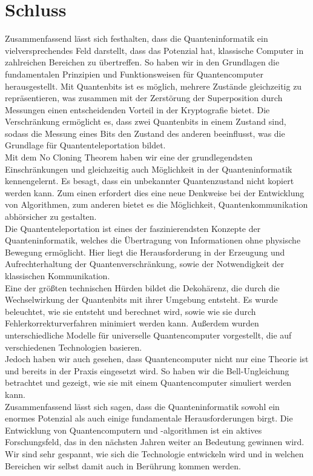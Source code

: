 \section{Schluss}
\label{sec:schluss}

Zusammenfassend lässt sich festhalten, dass die Quanteninformatik ein vielversprechendes Feld darstellt, dass das Potenzial hat, klassische Computer in zahlreichen Bereichen zu übertreffen.
So haben wir in den Grundlagen die fundamentalen Prinzipien und Funktionsweisen für Quantencomputer herausgestellt.
Mit Quantenbits ist es möglich, mehrere Zustände gleichzeitig zu repräsentieren, was zusammen mit der Zerstörung der Superposition durch Messungen einen entscheidenden Vorteil in der Kryptografie bietet.
Die Verschränkung ermöglicht es, dass zwei Quantenbits in einem Zustand sind, sodass die Messung eines Bits den Zustand des anderen beeinflusst, was die Grundlage für Quantenteleportation bildet.\\

Mit dem No Cloning Theorem haben wir eine der grundlegendsten Einschränkungen und gleichzeitig auch Möglichkeit in der Quanteninformatik kennengelernt.
Es besagt, dass ein unbekannter Quantenzustand nicht kopiert werden kann.
Zum einen erfordert dies eine neue Denkweise bei der Entwicklung von Algorithmen, zum anderen bietet es die Möglichkeit, Quantenkommunikation abhörsicher zu gestalten.\\

Die Quantenteleportation ist eines der faszinierendsten Konzepte der Quanteninformatik, welches die Übertragung von Informationen ohne physische Bewegung ermöglicht.
Hier liegt die Herausforderung in der Erzeugung und Aufrechterhaltung der Quantenverschränkung, sowie der Notwendigkeit der klassischen Kommunikation.\\

Eine der größten technischen Hürden bildet die Dekohärenz, die durch die Wechselwirkung der Quantenbits mit ihrer Umgebung entsteht.
Es wurde beleuchtet, wie sie entsteht und berechnet wird, sowie wie sie durch Fehlerkorrekturverfahren minimiert werden kann.
Außerdem wurden unterschiedliche Modelle für universelle Quantencomputer vorgestellt, die auf verschiedenen Technologien basieren.\\

Jedoch haben wir auch gesehen, dass Quantencomputer nicht nur eine Theorie ist und bereits in der Praxis eingesetzt wird.
So haben wir die Bell-Ungleichung betrachtet und gezeigt, wie sie mit einem Quantencomputer simuliert werden kann.\\

Zusammenfassend lässt sich sagen, dass die Quanteninformatik sowohl ein enormes Potenzial als auch einige fundamentale Herausforderungen birgt.
Die Entwicklung von Quantencomputern und -algorithmen ist ein aktives Forschungsfeld, das in den nächsten Jahren weiter an Bedeutung gewinnen wird.
Wir sind sehr gespannt, wie sich die Technologie entwickeln wird und in welchen Bereichen wir selbst damit auch in Berührung kommen werden.









